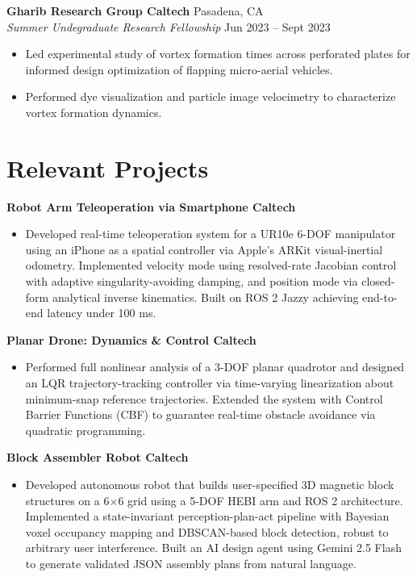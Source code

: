 \documentclass[11pt,a4paper]{article}
\begin{document}
\noindent\textbf{Gharib Research Group \textbar{} Caltech} \hfill Pasadena, CA \\
\textit{Summer Undegraduate Research Fellowship} \hfill Jun 2023 -- Sept 2023
\begin{itemize}[leftmargin=1.2em, itemsep=0.2pt, topsep=0.4pt]
    \item Led experimental study of vortex formation times across perforated plates for informed design optimization of flapping micro-aerial vehicles.
    \item Performed dye visualization and particle image velocimetry to characterize vortex formation dynamics.
\end{itemize}

\section*{Relevant Projects}

\textbf{Robot Arm Teleoperation via Smartphone \textbar{} Caltech}
\begin{itemize}[leftmargin=1.2em, itemsep=0.2pt, topsep=0.4pt, after=\vspace{4pt}]
    \item Developed real-time teleoperation system for a UR10e 6-DOF manipulator using an iPhone as a spatial controller via Apple's ARKit visual-inertial odometry. Implemented velocity mode using resolved-rate Jacobian control with adaptive singularity-avoiding damping, and position mode via closed-form analytical inverse kinematics. Built on ROS 2 Jazzy achieving end-to-end latency under 100 ms.
\end{itemize}

\noindent\textbf{Planar Drone: Dynamics \& Control \textbar{} Caltech}
\begin{itemize}[leftmargin=1.2em, itemsep=0.2pt, topsep=0.4pt, after=\vspace{4pt}]
    \item Performed full nonlinear analysis of a 3-DOF planar quadrotor and designed an LQR trajectory-tracking controller via time-varying linearization about minimum-snap reference trajectories. Extended the system with Control Barrier Functions (CBF) to guarantee real-time obstacle avoidance via quadratic programming.
\end{itemize}

\noindent\textbf{Block Assembler Robot \textbar{} Caltech}
\begin{itemize}[leftmargin=1.2em, itemsep=0.2pt, topsep=0.4pt, after=\vspace{4pt}]
    \item Developed autonomous robot that builds user-specified 3D magnetic block structures on a 6$\times$6 grid using a 5-DOF HEBI arm and ROS 2 architecture. Implemented a state-invariant perception-plan-act pipeline with Bayesian voxel occupancy mapping and DBSCAN-based block detection, robust to arbitrary user interference. Built an AI design agent using Gemini 2.5 Flash to generate validated JSON assembly plans from natural language.
\end{itemize}
\end{document}
